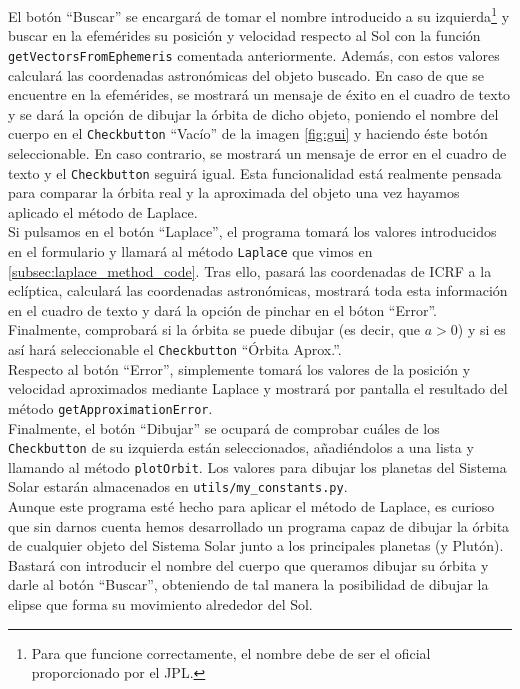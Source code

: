 \documentclass[11pt]{book}
\begin{document}
El botón ``Buscar'' se encargará de tomar el nombre introducido a su izquierda\footnote{Para que funcione correctamente, el nombre debe de ser el oficial proporcionado por el JPL.} y buscar en la efemérides su posición y velocidad respecto al Sol con la función \texttt{getVectorsFromEphemeris} comentada anteriormente. Además, con estos valores calculará las coordenadas astronómicas del objeto buscado. En caso de que se encuentre en la efemérides, se mostrará un mensaje de éxito en el cuadro de texto y se dará la opción de dibujar la órbita de dicho objeto, poniendo el nombre del cuerpo en el \texttt{Checkbutton} ``Vacío'' de la imagen \ref{fig:gui} y haciendo éste botón seleccionable. En caso contrario, se mostrará un mensaje de error en el cuadro de texto y el \texttt{Checkbutton} seguirá igual. Esta funcionalidad está realmente pensada para comparar la órbita real y la aproximada del objeto una vez hayamos aplicado el método de Laplace.\\

Si pulsamos en el botón ``Laplace'', el programa tomará los valores introducidos en el formulario y llamará al método \texttt{Laplace} que vimos en \ref{subsec:laplace_method_code}. Tras ello, pasará las coordenadas de ICRF a la eclíptica, calculará las coordenadas astronómicas, mostrará toda esta información en el cuadro de texto y dará la opción de pinchar en el bóton ``Error''. Finalmente, comprobará si la órbita se puede dibujar (es decir, que $a>0$) y si es así hará seleccionable el \texttt{Checkbutton} ``Órbita Aprox.''.\\

Respecto al botón ``Error'', simplemente tomará los valores de la posición y velocidad aproximados mediante Laplace y mostrará por pantalla el resultado del método \texttt{getApproximationError}.\\

Finalmente, el botón ``Dibujar'' se ocupará de comprobar cuáles de los \texttt{Checkbutton} de su izquierda están seleccionados, añadiéndolos a una lista y llamando al método \texttt{plotOrbit}. Los valores para dibujar los planetas del Sistema Solar estarán almacenados en \texttt{utils/my\_constants.py}.\\

Aunque este programa esté hecho para aplicar el método de Laplace, es curioso que sin darnos cuenta hemos desarrollado un programa capaz de dibujar la órbita de cualquier objeto del Sistema Solar junto a los principales planetas (y Plutón). Bastará con introducir el nombre del cuerpo que queramos dibujar su órbita y darle al botón ``Buscar'', obteniendo de tal manera la posibilidad de dibujar la elipse que forma su movimiento alrededor del Sol.\\
\end{document}
